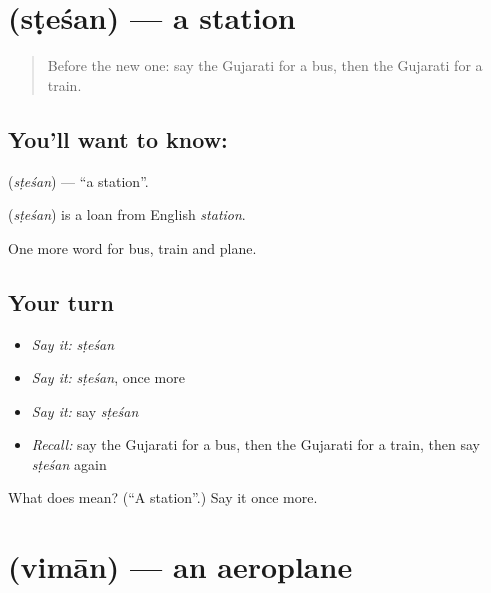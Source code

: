 \section[\texorpdfstring{\gu{સ્ટેશન} (sṭeśan)}{સ્ટેશન (sṭeśan)}]{ (sṭeśan) — a station}

\label{lesson:GU-C85-station}



\begin{quote}
Before the new one: say the Gujarati for a bus, then the Gujarati for a train.
\end{quote}

\subsection*{You'll want to know: }
\textbf{} (\emph{sṭeśan}) — \textquotedblleft{}a station\textquotedblright{}.

\begin{cousinweb}
\textbf{} (\emph{sṭeśan}) is a loan from English \emph{station}.
\end{cousinweb}

\begin{grammarlens}[title={What you've built}]
One more word for bus, train and plane.
\end{grammarlens}

\subsection*{Your turn}
\begin{itemize}
\raggedright
  \item \emph{Say it:} \emph{sṭeśan}
  \item \emph{Say it:} \emph{sṭeśan}, once more
  \item \emph{Say it:} say \emph{sṭeśan}
  \item \emph{Recall:} say the Gujarati for a bus, then the Gujarati for a train, then say \emph{sṭeśan} again
\end{itemize}

\begin{tcolorbox}[breakable,colback=teal!4,colframe=teal!35!black,title={Before you move on}]
What does  mean? (\textquotedblleft{}A station\textquotedblright{}.) Say it once more.
\end{tcolorbox}
\section[\texorpdfstring{\gu{વિમાન} (vimān)}{વિમાન (vimān)}]{ (vimān) — an aeroplane}

